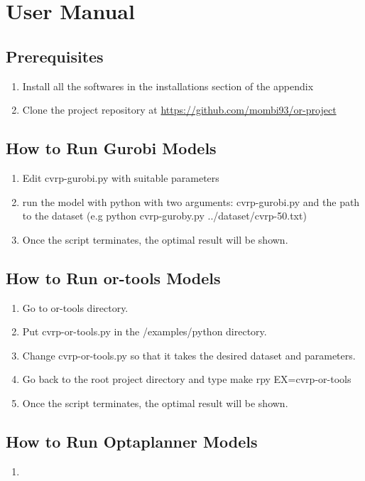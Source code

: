 \chapter{User Manual}
\section{Prerequisites}
\begin{enumerate}
    \item Install all the softwares in the installations section of the appendix
    \item Clone the project repository at \url{https://github.com/mombi93/or-project}
\end{enumerate}

\section{How to Run Gurobi Models}
\begin{enumerate}
    \item Edit cvrp-gurobi.py with suitable parameters
    \item run the model with python with two arguments: cvrp-gurobi.py and the path to the dataset
    (e.g python cvrp-guroby.py ../dataset/cvrp-50.txt)
    \item Once the script terminates, the optimal result will be shown.
\end{enumerate}

\section{How to Run or-tools Models}
\begin{enumerate}
    \item Go to or-tools directory.
    \item Put cvrp-or-tools.py in the /examples/python directory.
    \item Change cvrp-or-tools.py so that it takes the desired dataset and parameters.
    \item Go back to the root project directory and type make rpy EX=cvrp-or-tools
    \item Once the script terminates, the optimal result will be shown.
\end{enumerate}

\section{How to Run Optaplanner Models}
\begin{enumerate}
    \item
\end{enumerate}

